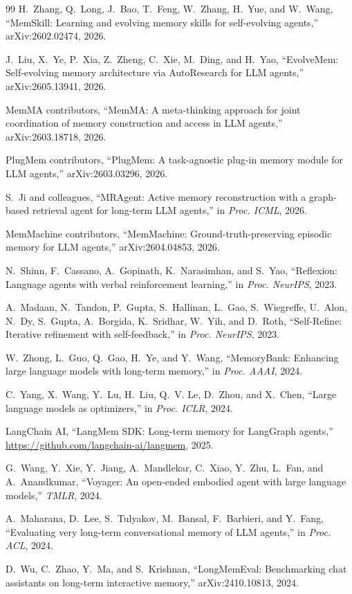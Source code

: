 \documentclass[UTF8,11pt]{ctexart}
\begin{document}
\begin{thebibliography}{99}
H.~Zhang, Q.~Long, J.~Bao, T.~Feng, W.~Zhang, H.~Yue, and W.~Wang, ``MemSkill:
Learning and evolving memory skills for self-evolving agents,'' arXiv:2602.02474,
2026.

J.~Liu, X.~Ye, P.~Xia, Z.~Zheng, C.~Xie, M.~Ding, and H.~Yao, ``EvolveMem:
Self-evolving memory architecture via AutoResearch for LLM agents,''
arXiv:2605.13941, 2026.

MemMA contributors, ``MemMA: A meta-thinking approach for joint coordination of
memory construction and access in LLM agents,'' arXiv:2603.18718, 2026.

PlugMem contributors, ``PlugMem: A task-agnostic plug-in memory module for LLM
agents,'' arXiv:2603.03296, 2026.

S.~Ji and colleagues, ``MRAgent: Active memory reconstruction with a graph-based
retrieval agent for long-term LLM agents,'' in \emph{Proc. ICML}, 2026.

MemMachine contributors, ``MemMachine: Ground-truth-preserving episodic memory
for LLM agents,'' arXiv:2604.04853, 2026.

N.~Shinn, F.~Cassano, A.~Gopinath, K.~Narasimhan, and S.~Yao, ``Reflexion:
Language agents with verbal reinforcement learning,'' in \emph{Proc. NeurIPS},
2023.

A.~Madaan, N.~Tandon, P.~Gupta, S.~Hallinan, L.~Gao, S.~Wiegreffe, U.~Alon,
N.~Dy, S.~Gupta, A.~Borgida, K.~Sridhar, W.~Yih, and D.~Roth, ``Self-Refine:
Iterative refinement with self-feedback,'' in \emph{Proc. NeurIPS}, 2023.

W.~Zhong, L.~Guo, Q.~Gao, H.~Ye, and Y.~Wang, ``MemoryBank: Enhancing
large language models with long-term memory,'' in \emph{Proc. AAAI}, 2024.

C.~Yang, X.~Wang, Y.~Lu, H.~Liu, Q.~V. Le, D.~Zhou, and X.~Chen,
``Large language models as optimizers,'' in \emph{Proc. ICLR}, 2024.

LangChain AI, ``LangMem SDK: Long-term memory for LangGraph agents,''
\url{https://github.com/langchain-ai/langmem}, 2025.

G.~Wang, Y.~Xie, Y.~Jiang, A.~Mandlekar, C.~Xiao, Y.~Zhu, L.~Fan, and A.~Anandkumar,
``Voyager: An open-ended embodied agent with large language models,''
\emph{TMLR}, 2024.

A.~Maharana, D.~Lee, S.~Tulyakov, M.~Bansal, F.~Barbieri, and Y.~Fang,
``Evaluating very long-term conversational memory of LLM agents,''
in \emph{Proc. ACL}, 2024.

D.~Wu, C.~Zhao, Y.~Ma, and S.~Krishnan, ``LongMemEval: Benchmarking chat
assistants on long-term interactive memory,'' arXiv:2410.10813, 2024.

\end{thebibliography}
\end{document}
